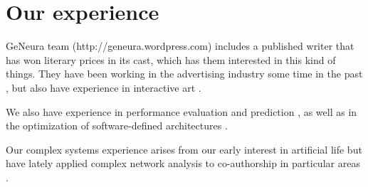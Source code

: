 \documentclass[a4paper]{article}
\begin{document}
\section{Our experience}

GeNeura team (http://geneura.wordpress.com) includes a published
writer that has won literary prices in its cast, which has them
interested in this kind of things. They have been working in the
advertising industry some time in the past
\cite{merelo:ecal97,AISB97}, but also have experience in interactive
art \cite{DBLP:conf/cec/TrujilloVVG13,DBLP:conf/cec/FernandesIBRG11}.


We also have experience in performance evaluation and prediction
\cite{castillo:evostar08,hardwareevo}, as well as in the optimization of
software-defined architectures \cite{gecco08:castillo}.

Our complex systems experience arises from our early interest in
artificial life \cite{ecal93} but have lately applied complex network
analysis to co-authorship in particular areas
\cite{ec-network-2007,merelo2013complex,DBLP:journals/corr/abs-1108-0261}. 




\end{document}
